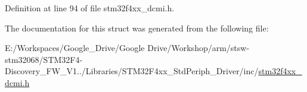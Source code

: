 Definition at line 94 of file stm32f4xx\-\_\-dcmi.\-h.



The documentation for this struct was generated from the following file\-:\begin{DoxyCompactItemize}
\item 
E\-:/\-Workspaces/\-Google\-\_\-\-Drive/\-Google Drive/\-Workshop/arm/stsw-\/stm32068/\-S\-T\-M32\-F4-\/\-Discovery\-\_\-\-F\-W\-\_\-\-V1../\-Libraries/\-S\-T\-M32\-F4xx\-\_\-\-Std\-Periph\-\_\-\-Driver/inc/\hyperlink{stm32f4xx__dcmi_8h}{stm32f4xx\-\_\-dcmi.\-h}\end{DoxyCompactItemize}

